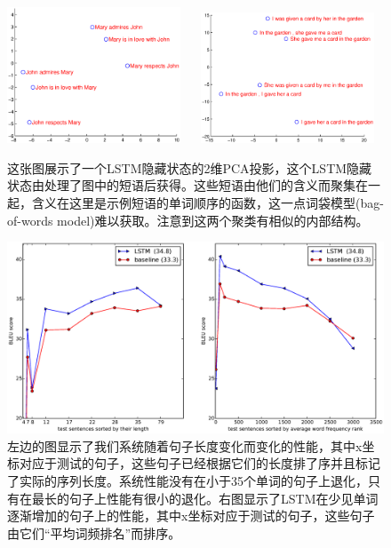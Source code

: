 \begin{figure}[h!]
\centering
\includegraphics[width=0.46\textwidth]{figure2} ~~
\includegraphics[width=0.46\textwidth]{figure3} 
\caption{\small 这张图展示了一个LSTM隐藏状态的2维PCA投影，这个LSTM隐藏状态由处理了图中的短语后获得。这些短语由他们的含义而聚集在一起，含义在这里是示例短语的单词顺序的函数，这一点词袋模型(bag-of-words model)难以获取。注意到这两个聚类有相似的内部结构。}
\label{fig:embedding}
\end{figure}

\begin{figure}[h!]
\centerline{
\includegraphics[width=1.\textwidth]{good2.eps} }  
\caption{\small 左边的图显示了我们系统随着句子长度变化而变化的性能，其中x坐标对应于测试的句子，这些句子已经根据它们的长度排了序并且标记了实际的序列长度。系统性能没有在小于35个单词的句子上退化，只有在最长的句子上性能有很小的退化。右图显示了LSTM在少见单词逐渐增加的句子上的性能，其中x坐标对应于测试的句子，这些句子由它们``平均词频排名''而排序。
}
\label{fig:oriol}
\end{figure}

